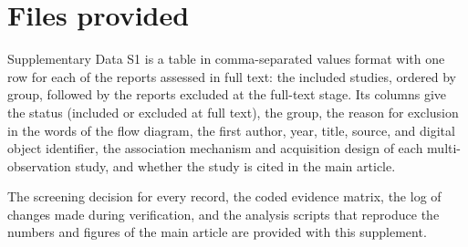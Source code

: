 \documentclass[a4paper,11pt]{article}
\begin{document}
\section{Files provided}\label{sup:files}

Supplementary Data S1 is a table in comma-separated values format with one row for each of the \nFTAssessed reports assessed in full text: the \nIncluded included studies, ordered by group, followed by the \nFTExcl reports excluded at the full-text stage. Its columns give the status (included or excluded at full text), the group, the reason for exclusion in the words of the flow diagram, the first author, year, title, source, and digital object identifier, the association mechanism and acquisition design of each multi-observation study, and whether the study is cited in the main article.

The screening decision for every record, the coded evidence matrix, the log of changes made during verification, and the analysis scripts that reproduce the numbers and figures of the main article are provided with this supplement.



\end{document}
